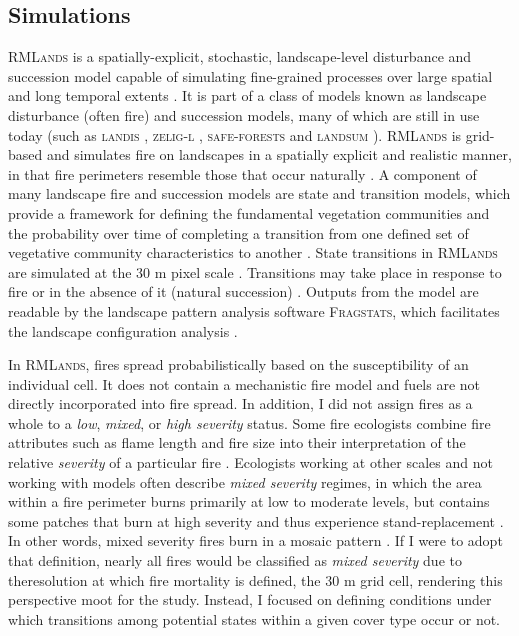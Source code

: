 \subsection*{Simulations}

\textsc{RMLands} is a spatially-explicit, stochastic, landscape-level disturbance and succession model capable of simulating fine-grained processes over large spatial and long temporal extents \citep{McGarigal2005}. It is part of a class of models known as landscape disturbance (often fire) and succession models, many of which are still in use today (such as \textsc{landis} \citep{He1999}, \textsc{zelig-l} \citep{Miller1999}, \textsc{safe-forests} \cite{Sessions1997} and \textsc{landsum} \citep{Keane2012}). \textsc{RMLands} is grid-based and simulates fire on landscapes in a spatially explicit and realistic manner, in that fire perimeters resemble those that occur naturally \citep{McGarigal2005a,McGarigal2005}. A component of many landscape fire and succession models are state and transition models, which provide a framework for defining the fundamental vegetation communities and the probability over time of completing a transition from one defined set of vegetative community characteristics to another \citep{Stringham2003,Blankenship2015}. State transitions in \textsc{RMLands} are simulated at the 30 m pixel scale \citep{Cushman2011}. Transitions may take place in response to fire or in the absence of it (natural succession) \citep{McGarigal2012}. Outputs from the model are readable by the landscape pattern analysis software \textsc{Fragstats}, which facilitates the landscape configuration analysis \citep{Fragstats2012}.

In \textsc{RMLands}, fires spread probabilistically based on the susceptibility of an individual cell. It does not contain a mechanistic fire model and fuels are not directly incorporated into fire spread. In addition, I did not assign fires as a whole to a \emph{low}, \emph{mixed}, or \emph{high severity} status. Some fire ecologists combine fire attributes such as flame length and fire size into their interpretation of the relative \emph{severity} of a particular fire \citep{Agee1993}. Ecologists working at other scales and not working with models often describe \emph{mixed severity} regimes, in which the area within a fire perimeter burns primarily at low to moderate levels, but contains some patches that burn at high severity and thus experience stand-replacement \citep{Collins2010,Kane2013}. In other words, mixed severity fires burn in a mosaic pattern \citep{Beaty2001}. If I were to adopt that definition, nearly all fires would be classified as \emph{mixed severity} due to theresolution at which fire mortality is defined, the 30 m grid cell, rendering this perspective moot for the study. Instead, I focused on defining conditions under which transitions among potential states within a given cover type occur or not. 

